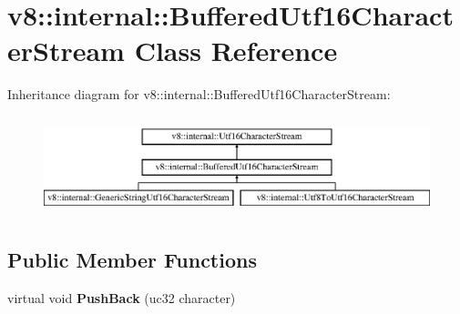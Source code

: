 \hypertarget{classv8_1_1internal_1_1_buffered_utf16_character_stream}{}\section{v8\+:\+:internal\+:\+:Buffered\+Utf16\+Character\+Stream Class Reference}
\label{classv8_1_1internal_1_1_buffered_utf16_character_stream}
Inheritance diagram for v8\+:\+:internal\+:\+:Buffered\+Utf16\+Character\+Stream\+:\begin{figure}[H]
\begin{center}
\leavevmode
\includegraphics[height=2.886598cm]{classv8_1_1internal_1_1_buffered_utf16_character_stream}
\end{center}
\end{figure}
\subsection*{Public Member Functions}
\begin{DoxyCompactItemize}
\item 
\hypertarget{classv8_1_1internal_1_1_buffered_utf16_character_stream_af4d1f6e6c36835c0704c4ed2e3babbcf}{}virtual void {\bfseries Push\+Back} (uc32 character)\label{classv8_1_1internal_1_1_buffered_utf16_character_stream_af4d1f6e6c36835c0704c4ed2e3babbcf}

\end{DoxyCompactItemize}
